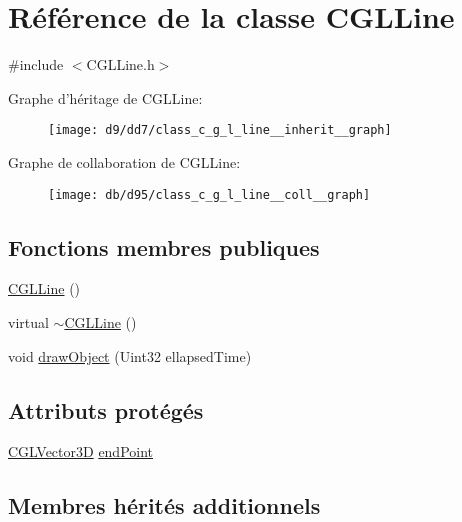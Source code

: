 \hypertarget{class_c_g_l_line}{\section{Référence de la classe C\-G\-L\-Line}
\label{class_c_g_l_line}
}


{\ttfamily \#include $<$C\-G\-L\-Line.\-h$>$}



Graphe d'héritage de C\-G\-L\-Line\-:\nopagebreak
\begin{figure}[H]
\begin{center}
\leavevmode
\texttt{[image: d9/dd7/class\_c\_g\_l\_line\_\_inherit\_\_graph]}
\end{center}
\end{figure}


Graphe de collaboration de C\-G\-L\-Line\-:
\nopagebreak
\begin{figure}[H]
\begin{center}
\leavevmode
\texttt{[image: db/d95/class\_c\_g\_l\_line\_\_coll\_\_graph]}
\end{center}
\end{figure}
\subsection*{Fonctions membres publiques}
\begin{DoxyCompactItemize}
\item 
\hyperlink{class_c_g_l_line_ab220112ce9d381cc057e6cff09fd95a7}{C\-G\-L\-Line} ()
\item 
virtual \hyperlink{class_c_g_l_line_ae00c52a8b8890cbe7657862aad150022}{$\sim$\-C\-G\-L\-Line} ()
\item 
void \hyperlink{class_c_g_l_line_a9621fa37a8b87f06e2a67aa8bf17d957}{draw\-Object} (Uint32 ellapsed\-Time)
\end{DoxyCompactItemize}
\subsection*{Attributs protégés}
\begin{DoxyCompactItemize}
\item 
\hyperlink{class_c_g_l_vector3_d}{C\-G\-L\-Vector3\-D} \hyperlink{class_c_g_l_line_a2c4e6d2079bbac662dddf3fc137ad4d9}{end\-Point}
\end{DoxyCompactItemize}
\subsection*{Membres hérités additionnels}



